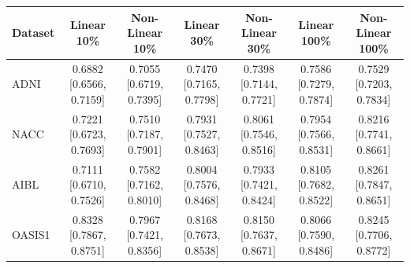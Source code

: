 \documentclass[pdflatex,sn-nature]{sn-jnl}%
\theoremstyle{thmstyleone}%
\theoremstyle{thmstyletwo}%
\theoremstyle{thmstylethree}%
\begin{document}
\begin{appendices}
\begin{table}[!ht]
\begin{tabular}{l|cc|cc|cc}
\toprule
Dataset &
Linear 10\% & Non-Linear 10\% &
Linear 30\% & Non-Linear 30\% &
Linear 100\% & Non-Linear 100\% \\
\midrule

ADNI &
\makecell{0.6882 \\ {[0.6566, 0.7159]}} &
\makecell{0.7055 \\ {[0.6719, 0.7395]}} &
\makecell{0.7470 \\ {[0.7165, 0.7798]}} &
\makecell{0.7398 \\ {[0.7144, 0.7721]}} &
\makecell{0.7586 \\ {[0.7279, 0.7874]}} &
\makecell{0.7529 \\ {[0.7203, 0.7834]}} \\

NACC &
\makecell{0.7221 \\ {[0.6723, 0.7693]}} &
\makecell{0.7510 \\ {[0.7187, 0.7901]}} &
\makecell{0.7931 \\ {[0.7527, 0.8463]}} &
\makecell{0.8061 \\ {[0.7546, 0.8516]}} &
\makecell{0.7954 \\ {[0.7566, 0.8531]}} &
\makecell{0.8216 \\ {[0.7741, 0.8661]}} \\

AIBL &
\makecell{0.7111 \\ {[0.6710, 0.7526]}} &
\makecell{0.7582 \\ {[0.7162, 0.8010]}} &
\makecell{0.8004 \\ {[0.7576, 0.8468]}} &
\makecell{0.7933 \\ {[0.7421, 0.8424]}} &
\makecell{0.8105 \\ {[0.7682, 0.8522]}} &
\makecell{0.8261 \\ {[0.7847, 0.8651]}} \\

OASIS1 &
\makecell{0.8328 \\ {[0.7867, 0.8751]}} &
\makecell{0.7967 \\ {[0.7421, 0.8356]}} &
\makecell{0.8168 \\ {[0.7673, 0.8538]}} &
\makecell{0.8150 \\ {[0.7637, 0.8671]}} &
\makecell{0.8066 \\ {[0.7590, 0.8486]}} &
\makecell{0.8245 \\ {[0.7706, 0.8772]}} \\


\end{tabular}
\end{table}
\end{appendices}
\end{document}
